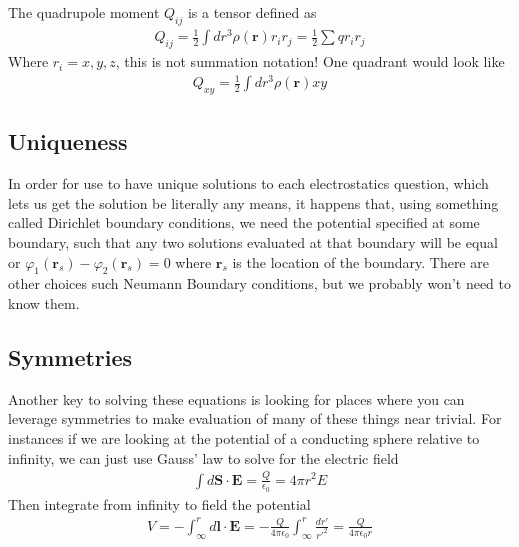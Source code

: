 The quadrupole moment $Q_{ij}$ is a tensor defined as 
\begin{align}
Q_{ij} = \frac{1}{2}\int dr^3 \rho(\textbf{r})r_ir_j = \frac{1}{2} \sum q r_i r_j
\end{align}
Where $r_i = x,y,z$, this is not summation notation! One quadrant would look like
\begin{align}
Q_{xy} = \frac{1}{2}\int dr^3 \rho(\textbf{r})xy
\end{align}





\subsection{Uniqueness}
In order for use to have unique solutions to each electrostatics question, which lets us get the solution be literally any means, it happens that\cite{zangwill}, using something called Dirichlet boundary conditions, we need the potential specified at some boundary, such that any two solutions evaluated at that boundary will be equal or $\varphi_1(\textbf{r}_s) -\varphi_2(\textbf{r}_s) = 0$ where $\textbf{r}_s$ is the location of the boundary. There are other choices such Neumann Boundary conditions, but we probably won't need to know them.

\subsection{Symmetries}
Another key to solving these equations is looking for places where you can leverage symmetries to make evaluation of many of these things near trivial. For instances if we are looking at the potential of a conducting sphere relative to infinity, we can just use Gauss' law to solve for the electric field
\begin{align}
\int d\textbf{S}\cdot\textbf{E} =\frac{Q}{\epsilon_0} = 4\pi r^2 E
\end{align}
Then integrate from infinity to field the potential
\begin{align}
V = - \int_\infty^r d\textbf{l}\cdot\textbf{E}  = -\frac{Q}{4\pi \epsilon_0}\int_\infty^r \frac{dr'}{r'^2} = \frac{Q}{4\pi\epsilon_0 r}
\end{align}



